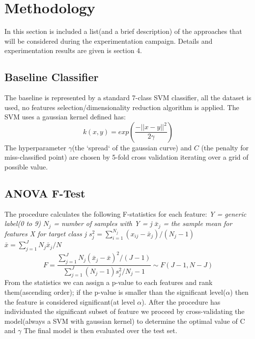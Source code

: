 \documentclass[a4paper,10pt]{article}
\begin{document}
\section{Methodology}
  In this section is included a list(and a brief description) of the approaches that will be considered during the experimentation campaign.\newline
  Details and experimentation results are given is section 4.
  
  \subsection{Baseline Classifier}
    The baseline is represented by a standard 7-class SVM classifier, all the dataset is used, no features selection/dimensionality
    reduction algorithm is applied. The SVM uses a gaussian kernel defined has:
    \begin{equation}
     k(x,y) = exp \left( \frac{-||x-y||^2}{2 \gamma} \right)
    \end{equation}
    The hyperparameter $\gamma$(the `spread` of the gaussian curve) and $C$ (the penalty for miss-classified point) are chosen by 5-fold
    cross validation iterating over a grid of possible value.
    
  \subsection{ANOVA F-Test}
    The procedure calculates the following F-statistics for each feature:\newline\newline
    \textit{Y = generic label(0 to 9) \newline $N_j$ = number of samples with Y = j \newline $\bar{x}_j$ = the sample mean for features X for target
    class j \newline
    $s_{j}^2 = \sum_{i=1}^{N_j} (x_{ij} - \bar{x}_j) / (N_j -1)$ \newline
    $\bar{x} = \sum_{j=1}^{J} N_j\bar{x}_j / N$ }\newline
    \begin{equation}
      F = \frac{\sum_{j=1}^{J} N_j(\bar{x}_j - \bar{x})^2 / (J - 1)}{\sum_{j=1}^{J} (N_j - 1)s_{j}^2 / N_j -1} \sim F(J-1, N-J)
    \end{equation}
    From the statistics we can assign a p-value to each features and rank them(ascending order); if the p-value is smaller
    than the significant level($\alpha$) then the feature is considered significant(at level $\alpha$).\newline
    After the procedure has individuated the significant subset of feature we proceed by cross-validating the model(always a SVM with gaussian kernel)
    to determine the optimal value of C and $\gamma$\newline
    The final model is then evaluated over the test set.
    
\end{document}
